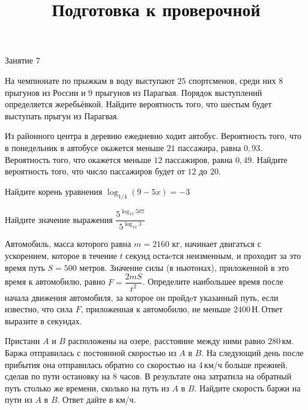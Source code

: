 	\begin{class}[number=7]
		\title{Подготовка к проверочной}
		\begin{listofex}
			\item Занятие 7
		\end{listofex}
	\end{class}
	
	\begin{exam}
		\begin{listofex}
			\item На чемпионате по прыжкам в воду выступают \( 25 \) спортсменов, среди них \( 8 \) прыгунов из России и \( 9 \) прыгунов из Парагвая. Порядок выступлений определяется жеребьёвкой. Найдите вероятность того, что шестым будет выступать прыгун из Парагвая.
			\item Из районного центра в деревню ежедневно ходит автобус. Вероятность того, что в понедельник в автобусе окажется меньше \( 21 \) пассажира, равна \( 0,93 \). Вероятность того, что окажется меньше \( 12 \) пассажиров, равна \( 0,49 \). Найдите вероятность того, что число пассажиров будет от \( 12 \) до \( 20 \).
			\item Найдите корень уравнения \( \log_{1/4}(9-5x)=-3 \)
			\item Найдите значение выражения \( \dfrac{5^{\log_{13}507}}{5^{\log_{13}3}} \)
			\item Автомобиль, масса которого равна \( m=2160 \) кг, начинает двигаться с ускорением, которое в течение \( t \) секунд остаeтся неизменным, и проходит за это время путь \( S=500  \) метров. Значение силы (в ньютонах), приложенной в это время к автомобилю, равно \( F=\dfrac{2mS}{t^2}  \).  Определите наибольшее время после начала движения автомобиля, за которое он пройдeт указанный путь, если известно, что сила \( F \), приложенная к автомобилю, не меньше \( 2400 \) Н. Ответ выразите в секундах.
			\item Пристани \( A \) и \( B \) расположены на озере, расстояние между ними равно \( 280 \) км. Баржа отправилась с постоянной скоростью из \( A \) в \( B \). На следующий день после прибытия она отправилась обратно со скоростью на \( 4 \) км/ч больше прежней, сделав по пути остановку на \( 8 \) часов. В результате она затратила на обратный путь столько же времени, сколько на путь из \( A \) в \( B \). Найдите скорость баржи на пути из \( A \) в \( B \). Ответ дайте в км/ч.
			\item
			\begin{minipage}[t]{0.43\textwidth}

\end{minipage}
\end{listofex}
\end{exam}
